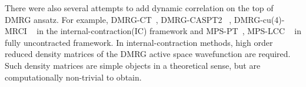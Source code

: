 There were also several attempts to add dynamic correlation on the top of DMRG ansatz.
For example, DMRG-CT~\cite{neuscamman_review_2010}, DMRG-CASPT2 ~\cite{kurashige_second-order_2011}, DMRG-cu(4)-MRCI ~\cite{saitow_fully_2015} in the internal-contraction(IC) framework and MPS-PT~\cite{sharma_communication:_2014}, MPS-LCC ~\cite{sharma_multireference_2015} in fully uncontracted framework.
In internal-contraction methods, high order reduced density matrices of the DMRG active space wavefunction are required. Such density matrices 
are simple objects in a theoretical sense, but are computationally non-trivial to obtain.

